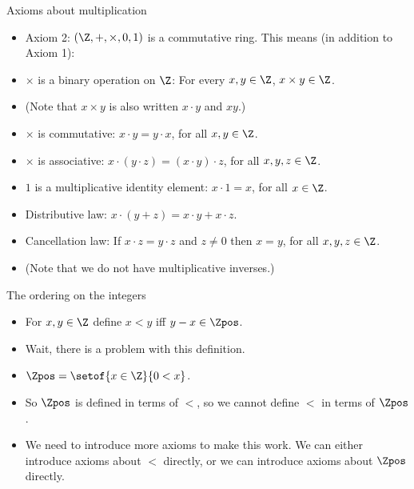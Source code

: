 \documentclass{beamer}
\begin{document}
\begin{frame}{Axioms about multiplication}

\begin{itemize}
  \item Axiom 2: $\left(\Z, +, \times, 0, 1\right)$ is a commutative ring. This means (in addition to Axiom 1):
  \item  $\times$ is a binary operation on $\Z$: For every $x,y\in\Z$, $x\times y\in\Z$.
  \item (Note that $x\times y$ is also written $x\cdot y$ and $x y$.)
  \item  $\times$ is commutative: $x\cdot y= y \cdot x$, for all $x,y\in\Z$.
  \item  $\times $ is associative: $x \cdot (y\cdot z) = (x\cdot y) \cdot z$, for all $x,y,z\in\Z$.
  \item  $1$ is a multiplicative identity element: $x\cdot 1 = x$, for all $x\in\Z$.
  \item Distributive law: $x\cdot (y + z) = x \cdot y + x \cdot z$.
  \item Cancellation law: If $x\cdot z = y \cdot z$ and $z\not=0$ then $x=y$, for all $x,y,z\in\Z$.
  \item  (Note that we do not have multiplicative inverses.)
\end{itemize}

\end{frame}

\begin{frame}{The ordering on the integers}

\begin{itemize}
  \item For $x,y\in\Z$ define $x<y$ iff $y-x\in\Zpos$.
  \item Wait, there is a problem with this definition.
  \item $\Zpos = \setof{x\in\Z}{0<x}$.
  \item So $\Zpos$ is defined in terms of $<$, so we cannot define $<$ in terms of $\Zpos$.
  \item We need to introduce more axioms to make this work. We can either introduce
  axioms about $<$ directly, or we can introduce axioms about $\Zpos$ directly.
\end{itemize}
\end{frame}
\end{document}
